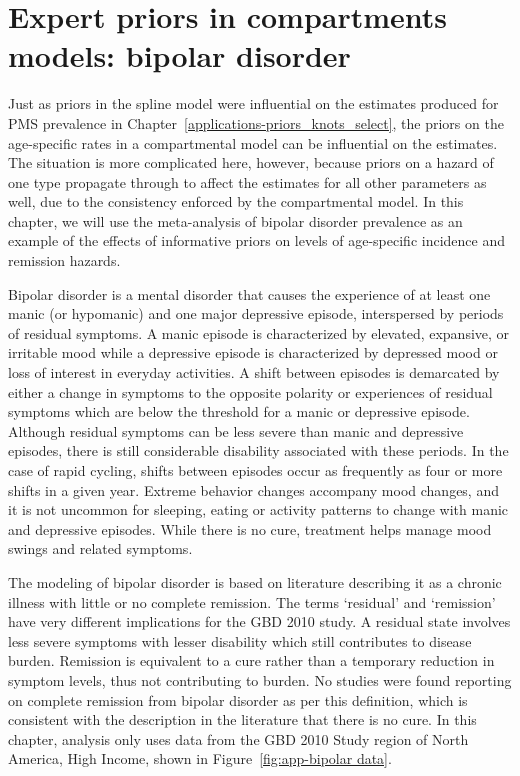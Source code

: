 \chapter{Expert priors in compartments models: bipolar disorder}
\label{applications-prior_level_vals}

Just as priors in the spline model were influential on the estimates
produced for PMS prevalence in
Chapter~\ref{applications-priors_knots_select}, the priors on the
age-specific rates in a compartmental model can be influential on the
estimates.  The situation is more complicated here, however, because
priors on a hazard of one type propagate through to affect the
estimates for all other parameters as well, due to the consistency
enforced by the compartmental model.  In this chapter, we will use the
meta-analysis of bipolar disorder prevalence as an example of the
effects of informative priors on levels of age-specific incidence and
remission hazards.

Bipolar disorder is a mental disorder that causes the experience
of at least one manic (or hypomanic) and one major depressive episode,
interspersed by periods of residual symptoms.  A manic episode is
characterized by elevated, expansive, or irritable mood while a
depressive episode is characterized by depressed mood or loss of
interest in everyday activities.  A shift between episodes is
demarcated by either a change in symptoms to the opposite polarity
or experiences of residual symptoms which are below the threshold
for a manic or depressive episode.  Although residual symptoms can be
less severe than manic and depressive episodes, there is still
considerable disability associated with these periods.  In the case of rapid cycling,
shifts between episodes occur as frequently as four or more shifts
in a given year.  Extreme behavior
changes accompany mood changes, and it is not uncommon for sleeping,
eating or activity patterns to change with manic and depressive
episodes.
While there
is no cure, treatment helps manage mood swings and related
symptoms. \cite{kloos_bipolar_2011, angst_historical_2000}

The modeling of bipolar disorder is based on literature describing it
as a chronic illness with little or no complete remission.
The terms `residual' and `remission' have very different implications
for the GBD 2010 study.  A residual state involves less severe
symptoms with lesser disability which still contributes to disease
burden.  Remission is equivalent to a cure rather than a temporary
reduction in symptom levels, thus not contributing to burden.  No studies
were found reporting on complete remission from bipolar disorder as per this definition,
which is consistent with the description in the literature that there
is no cure. \cite{american_psychiatric_association_diagnostic_2000}
In this chapter, analysis
only uses data from the GBD 2010 Study region of North America, High Income,
shown in Figure~\ref{fig:app-bipolar data}.

